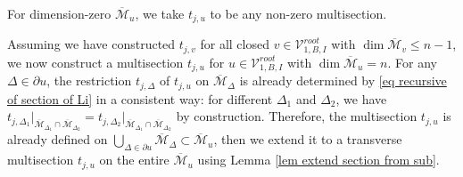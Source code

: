 \documentclass[11pt]{amsart}
\theoremstyle{definition}
\theoremstyle{remark}
\newcommand{\<}{\left<}
\renewcommand{\>}{\right>}
\numberwithin{equation}{section}
\def\Mbar{{\overline{\mathcal M}}}
\begin{document}
For dimension-zero $\Mbar_u$, we take $t_{j,u}$ to be any non-zero multisection. 

Assuming we have constructed $t_{j,v}$ for all closed $v\in \mathcal V^{root}_{1,B,I}$ with $\dim \Mbar_v \le n-1$, we now construct a multisection $t_{j,u}$ for $u\in \mathcal V^{root}_{1,B,I}$ with $\dim \Mbar_u = n$. For any $\Delta \in \partial u$, the restriction $t_{j,\Delta}$ of $t_{j,u}$ on $\Mbar_{\Delta}$ is already determined by \eqref{eq recursive of section of Li} in a consistent way: for different $\Delta_1$ and $\Delta_2$, we have $t_{j,\Delta_1}\vert_{\Mbar_{\Delta_1}\cap \Mbar_{\Delta_2}}=t_{j,\Delta_2}\vert_{\Mbar_{\Delta_1}\cap \Mbar_{\Delta_2}}$ by construction. Therefore, the multisection $t_{j,u}$ is already defined on $\bigcup_{\Delta \in \partial u}\Mbar_\Delta \subset \Mbar_u$, then we  extend it to a transverse multisection $t_{j,u}$ on the entire $\Mbar_u$ using Lemma \ref{lem extend section from sub}.
\end{document}
